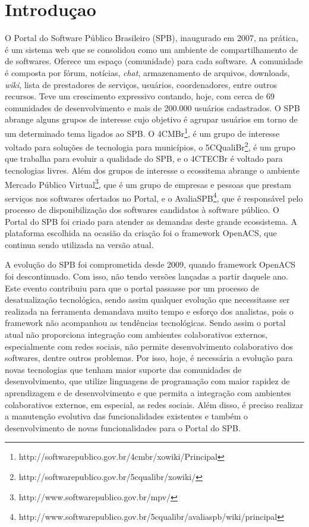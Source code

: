 \section{Introduçao}
\label{sec:introducao}

O Portal do Software Público Brasileiro (SPB), inaugurado em 2007, na prática,
é um sistema web que se consolidou como um ambiente de compartilhamento de
de softwares.
%
Oferece um espaço (comunidade) para cada software. A comunidade é composta por
fórum, notícias, {\it chat}, armazenamento de arquivos, downloads, {\it wiki}, lista de
prestadores de serviços, usuários, coordenadores, entre outros recursos.
%
Teve um crescimento expressivo contando, hoje, com cerca de 69 comunidades de
desenvolvimento e mais de 200.000 usuários cadastrados.
%
O SPB abrange alguns grupos de interesse cujo objetivo é agrupar usuários em torno de um determinado tema ligados ao SPB. O 4CMBr\footnote{http://softwarepublico.gov.br/4cmbr/xowiki/Principal}, é um grupo de interesse voltado para soluções
de tecnologia para municípios, o 5CQualiBr\footnote{http://softwarepublico.gov.br/5cqualibr/xowiki/}, é um grupo que trabalha para
evoluir a qualidade do SPB, e o 4CTECBr é voltado para tecnologias livres.
%
Além dos grupos de interesse o ecossitema abrange o ambiente Mercado Público Virtual\footnote{http://www.softwarepublico.gov.br/mpv/}, que é um
grupo de empresas e pessoas que prestam serviços nos softwares ofertados no
Portal, e o AvaliaSPB\footnote{http://www.softwarepublico.gov.br/5cqualibr/avaliaspb/wiki/principal}, que é responsável pelo processo de disponibilização dos softwares candidatos à software
público.
%
O Portal do SPB foi criado para atender as demandas deste grande ecossistema. A plataforma escolhida na ocasião da
criação foi o framework OpenACS, que continua sendo utilizada na versão atual.


A evolução do SPB foi comprometida desde 2009, quando framework OpenACS foi 
descontinuado. Com isso, não tendo versões lançadas a partir daquele ano.
%
Este evento contribuiu para que o portal passasse por um processo de desatualização tecnológica, sendo assim qualquer evolução que necessitasse ser realizada na ferramenta demandava muito tempo e esforço dos analistas, 
pois o framework não acompanhou as tendências tecnológicas. Sendo assim o portal atual não proporciona integração com ambientes colaborativos
externos, especialmente com redes sociais, não permite desenvolvimento colaborativo dos softwares, dentre outros problemas.
Por isso, hoje, é necessária a evolução para novas tecnologias que tenham maior
suporte das comunidades de desenvolvimento, que utilize linguagens de programação
com maior rapidez de aprendizagem e de desenvolvimento e que permita a integração
com ambientes colaborativos externos, em especial, as redes sociais.
%
Além disso, é preciso realizar a manutenção evolutiva das funcionalidades
existentes e também o desenvolvimento de novas funcionalidades para o Portal
do SPB.



